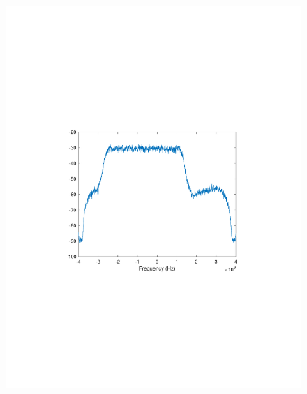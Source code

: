 \begin{refsection}
\begin{figure}[H]
	\centering
	\begin{minipage}{0.30\textwidth}
		\centering
		\includegraphics[clip, trim=4cm 8cm 4cm 8cm, width=1\textwidth]{./sdf/m_qam_system/figures/expResults/intradyne/3_4GBdInSig13dB_AfMIMO1.pdf}
		\label{fig:4GBdEyeMIMO1}
	\end{minipage}
	\begin{minipage}{0.30\textwidth}
		\centering

\end{minipage}
\end{figure}
\end{refsection}
